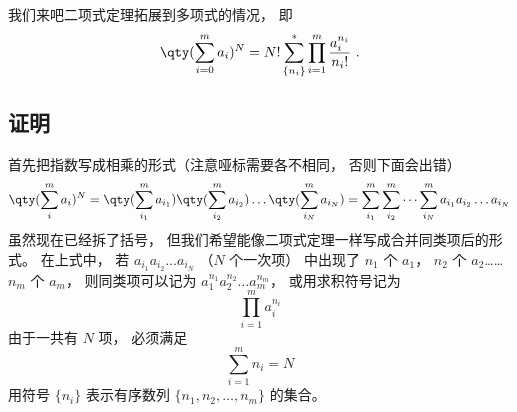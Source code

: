 

我们来吧二项式定理拓展到多项式的情况， 即
\begin{equation}
\qty(\sum_{i = 0}^m a_i)^N = N! \sum_{\{n_i\}}^* \prod_{i = 1}^m \frac{a_i^{n_i}}{n_i!}~.
\end{equation}

\subsection{证明}
首先把指数写成相乘的形式（注意哑标需要各不相同， 否则下面会出错）
\begin{equation}
\qty(\sum_i^m a_i)^N = \qty(\sum_{i_1}^m a_{i_1})\qty(\sum_{i_2}^m a_{i_2})\dots \qty(\sum_{i_N}^m a_{i_N}) = \sum_{i_1}^m \sum_{i_2}^m\dots \sum_{i_N}^m a_{i_1} a_{i_2}\dots a_{i_N}
\end{equation}
虽然现在已经拆了括号， 但我们希望能像二项式定理一样写成合并同类项后的形式。 在上式中， 若 $a_{i_1} a_{i_2}\dots a_{i_N}$ （$N$ 个一次项） 中出现了 $n_1$ 个 $a_1$， $n_2$ 个 $a_2$…… $n_m$ 个 $a_m$， 则同类项可以记为 $a_1^{n_1} a_2^{n_2} \dots a_m^{n_m}$， 或用求积符号记为
\begin{equation}
\prod_{i=1}^m a_i^{n_i}
\end{equation}
由于一共有 $N$ 项， 必须满足
\begin{equation}
\sum_{i=1}^m n_i = N
\end{equation}
用符号 $\{n_i\}$ 表示有序数列 $\{n_1,n_2,\dots, n_m\}$ 的集合。
